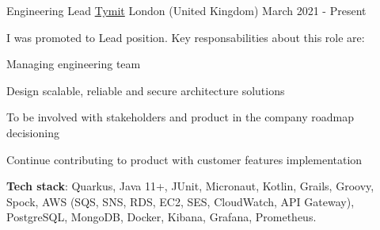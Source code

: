 

\begin{cventries}

  \cventry
    {Engineering Lead} %
    {\href{https://tymit.com}{Tymit}} %
    {London (United Kingdom)} %
    {March 2021 - Present} %
    {
      \begin{cvitems} %
        \item[] I was promoted to Lead position. Key responsabilities about this role are:
        \item[]
        \item {Managing engineering team}
        \item {Design scalable, reliable and secure architecture solutions}
        \item {To be involved with stakeholders and product in the company roadmap decisioning}
        \item {Continue contributing to product with customer features implementation}
        \item[]
        \item[]\textbf{Tech stack}: Quarkus, Java 11+, JUnit, Micronaut, Kotlin, Grails, Groovy, Spock, AWS (SQS, SNS, RDS, EC2, SES, CloudWatch, API Gateway), PostgreSQL, MongoDB, Docker, Kibana, Grafana, Prometheus.
      \end{cvitems}
    }
    

\end{cventries}
